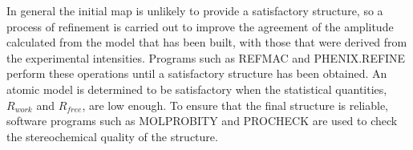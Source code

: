         In general the initial map is unlikely to provide a satisfactory structure, so a process of refinement is carried out to improve the agreement of the amplitude calculated from the model that has been built, with those that were derived from the experimental intensities.
        Programs such as REFMAC \cite{murshudov2011refmac5} and PHENIX.REFINE \cite{adams2010phenix} perform these operations until a satisfactory structure has been obtained.
        An atomic model is determined to be satisfactory when the statistical quantities, $R_{work}$ and $R_{free}$, are low enough.
        To ensure that the final structure is reliable, software programs such as MOLPROBITY \cite{chen2010molprobity} and PROCHECK \cite{laskowski1993procheck} are used to check the stereochemical quality of the structure.
